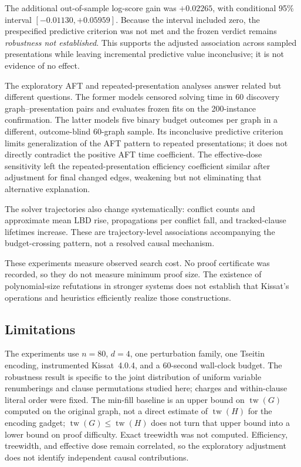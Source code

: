 \documentclass[11pt]{article}
\begin{document}
The additional out-of-sample log-score gain was $+0.02265$, with conditional 95\% interval $[-0.01130,+0.05959]$. Because the interval included zero, the prespecified predictive criterion was not met and the frozen verdict remains \emph{robustness not established}. This supports the adjusted association across sampled presentations while leaving incremental predictive value inconclusive; it is not evidence of no effect.

The exploratory AFT and repeated-presentation analyses answer related but different questions. The former models censored solving time in 60 discovery graph--presentation pairs and evaluates frozen fits on the 200-instance confirmation. The latter models five binary budget outcomes per graph in a different, outcome-blind 60-graph sample. Its inconclusive predictive criterion limits generalization of the AFT pattern to repeated presentations; it does not directly contradict the positive AFT time coefficient. The effective-dose sensitivity left the repeated-presentation efficiency coefficient similar after adjustment for final changed edges, weakening but not eliminating that alternative explanation.

The solver trajectories also change systematically: conflict counts and approximate mean LBD rise, propagations per conflict fall, and tracked-clause lifetimes increase. These are trajectory-level associations accompanying the budget-crossing pattern, not a resolved causal mechanism.

These experiments measure observed search cost. No proof certificate was recorded, so they do not measure minimum proof size. The existence of polynomial-size refutations in stronger systems does not establish that Kissat's operations and heuristics efficiently realize those constructions.

\subsection{Limitations}

The experiments use $n=80$, $d=4$, one perturbation family, one Tseitin encoding, instrumented Kissat~4.0.4, and a 60-second wall-clock budget. The robustness result is specific to the joint distribution of uniform variable renumberings and clause permutations studied here; charges and within-clause literal order were fixed. The min-fill baseline is an upper bound on $\operatorname{tw}(G)$ computed on the original graph, not a direct estimate of $\operatorname{tw}(H)$ for the encoding gadget; $\operatorname{tw}(G)\leq\operatorname{tw}(H)$ does not turn that upper bound into a lower bound on proof difficulty. Exact treewidth was not computed. Efficiency, treewidth, and effective dose remain correlated, so the exploratory adjustment does not identify independent causal contributions.
\end{document}
